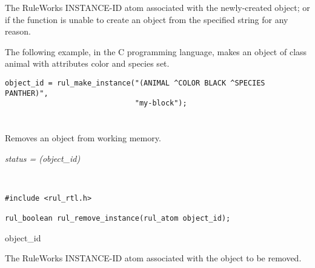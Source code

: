 The RuleWorks INSTANCE-ID atom associated with the newly-created
object; or  if the function is unable to
create an object from the specified string for any reason.

\Example

The following example, in the C programming language, makes an object
of class animal with attributes color and species set.

\begin{verbatim}
object_id = rul_make_instance("(ANIMAL ^COLOR BLACK ^SPECIES PANTHER)",
                              "my-block");
\end{verbatim}

\begin{seealso}





\end{seealso}

\section*{}

Removes an object from working memory.

\Syntax

\it{status} = (\it{object\_id})

\begin{args}
   \\
\end{args}

\CBinding
\begin{verbatim}
#include <rul_rtl.h>

rul_boolean rul_remove_instance(rul_atom object_id);
\end{verbatim}

\begin{argument}
\item[object\_id]

  The RuleWorks INSTANCE-ID atom associated with the object to be
  removed.
\end{argument}

